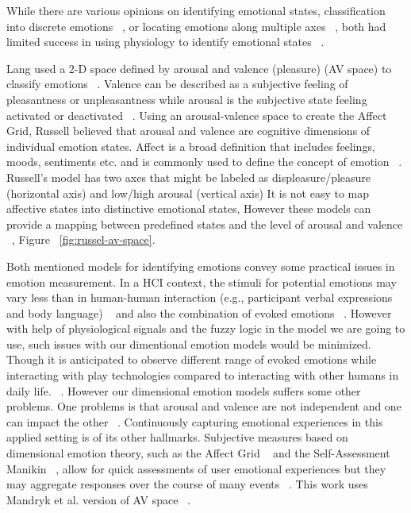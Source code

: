 \documentclass{uofsthesis-cs}
\begin{document}
While there are various opinions on identifying emotional states, classification into discrete emotions ~\cite{dalgleish1999handbook}, or locating emotions along multiple axes ~\cite{russell1989affect, lang1995emotion}, both had limited success in using physiology to identify emotional states ~\cite{cacioppo2000psychophysiology}.

Lang used a 2-D space defined by arousal and valence (pleasure) (AV space) to classify emotions ~\cite{lang1995emotion}. Valence can be described as a subjective feeling of pleasantness or unpleasantness while arousal is the subjective state feeling activated or deactivated ~\cite{barrett1998discrete}. Using an arousal-valence space to create the Affect Grid, Russell believed that arousal and valence are cognitive dimensions of individual emotion states. Affect is a broad definition that includes feelings, moods, sentiments etc. and is commonly used to define the concept of emotion ~\cite{picard2003affective}. Russell's model has two axes that might be labeled as displeasure/pleasure (horizontal axis) and low/high arousal (vertical axis) It is not easy to map affective states into distinctive emotional states, However these models can provide a mapping between predefined states and the level of arousal and valence ~\cite{zagalo2004story}, Figure ~\ref{fig:russel-av-space}.


Both mentioned models for identifying emotions convey some practical issues in emotion measurement. In a HCI context, the stimuli for potential emotions may vary less than in human-human interaction (e.g., participant verbal expressions and body language) ~\cite{zhang2010service} and also the combination of evoked emotions ~\cite{peter2006emotion}. However with help of physiological signals and the fuzzy logic in the model we are going to use, such issues with our dimentional emotion models would be minimized. Though it is anticipated to observe different range of evoked emotions while interacting with play technologies compared to interacting with other humans in daily life. ~\cite{zhang2010service}. However our dimensional emotion models suffers some other problems. One problems is that arousal and valence are not independent and one can impact the other ~\cite{mandryk2007fuzzy}. Continuously capturing emotional experiences in this applied setting is of its other hallmarks. Subjective measures based on dimensional emotion theory, such as the Affect Grid ~\cite{russell1989affect} and the Self-Assessment Manikin ~\cite{bradley1994measuring}, allow for quick assessments of user emotional experiences but they may aggregate responses over the course of many events ~\cite{zhang2010service}. This work uses Mandryk et al. version of AV space ~\cite{mandryk2007fuzzy}.
\end{document}

